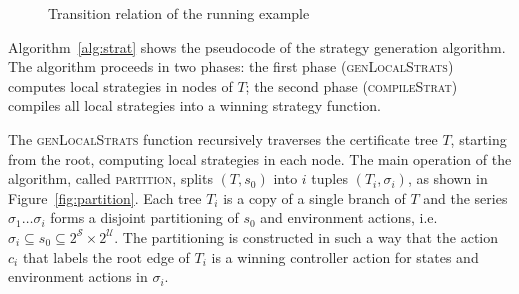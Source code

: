 
\begin{figure}
    \centering
    \caption{Transition relation of the running example}
    \label{fig:stratExample}
\end{figure}

Algorithm~\ref{alg:strat} shows the pseudocode of the strategy generation algorithm.  The algorithm proceeds in two phases: the first phase (\textsc{genLocalStrats}) computes local strategies in nodes of $T$; the second phase (\textsc{compileStrat}) compiles all local strategies into a winning strategy function.

The \textsc{genLocalStrats} function recursively traverses the certificate tree $T$, starting from the root, computing local strategies in each node.  The main operation of the algorithm, called \textsc{partition}, splits $(T, s_0)$ into $i$ tuples $(T_i, \sigma_i)$, as shown in Figure~\ref{fig:partition}.  Each tree $T_i$ is a copy of a single branch of $T$ and the series $\sigma_1 \ldots \sigma_i$ forms a disjoint partitioning of $s_0$ and environment actions, i.e. $\sigma_i \subseteq s_0 \subseteq 2^{\mathcal{S}} \times 2^{\mathcal{U}}$.  The partitioning is constructed in such a way that the action $c_i$ that labels the root edge of $T_i$ is a winning controller action for states and environment actions in $\sigma_i$.

